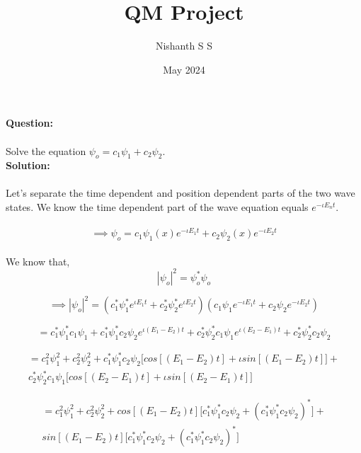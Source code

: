 \documentclass[12pt]{article}
\title{QM Project}
\author{Nishanth S S}
\date{May 2024}
\begin{document}
\maketitle

\noindent
\textbf{Question:}
\\
\\
Solve the equation $ \psi_o = c_1 \psi_1 + c_2 \psi_2. $ 
\\

\noindent
\textbf{Solution:}
\\
\\
Let's separate the  time dependent and position dependent parts of the two wave states. We know the time dependent part of the wave equation equals $ e^{-\iota E_n t}$. 
\\
\\
\[ \implies \psi_o = c_1 \psi_1(x) e^{-\iota E_1 t} + c_2 \psi_2(x) e^{-\iota E_2 t}\]
\\

We know that, \[ |\psi_o|^2 = \psi_o^* \psi_o \]

\[ \implies |\psi_o|^2 = (c_1^* \psi_1^* e^{\iota E_1 t} + c_2^* \psi_2^* e^{\iota E_2 t})(c_1 \psi_1 e^{-\iota E_1 t} + c_2 \psi_2 e^{-\iota E_2 t})\]

\[ = c_1^* \psi_1^* c_1 \psi_1 + c_1^* \psi_1^* c_2 \psi_2 e^{\iota (E_1 - E_2)t} + c_2^* \psi_2^* c_1 \psi_1 e^{\iota (E_2 - E_1)t} + c_2^* \psi_2^* c_2 \psi_2 \]

\begin{multline*}
= c_1^2 \psi_1^2 + c_2^2 \psi_2^2 + c_1^* \psi_1^* c_2 \psi_2 \Big [cos[(E_1 - E_2)t] + \iota sin[(E_1 - E_2)t] \Big]   + 
\\
c_2^* \psi_2^* c_1 \psi_1 \Big [cos[(E_2 - E_1)t] + \iota sin[(E_2 - E_1)t] \Big] 
\end{multline*}

\begin{multline*}
= c_1^2 \psi_1^2 + c_2^2 \psi_2^2 +  cos[(E_1 - E_2)t] \Big [c_1^* \psi_1^* c_2 \psi_2 + (c_1^* \psi_1^* c_2 \psi_2)^* \Big ] + 
\\
sin[(E_1 - E_2)t] \Big[ c_1^* \psi_1^* c_2 \psi_2 + (c_1^* \psi_1^* c_2 \psi_2)^* \Big]
\end{multline*}
\end{document}
